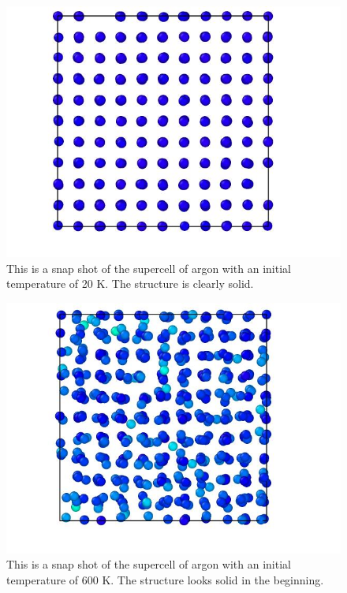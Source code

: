 \begin{multicols}{2}

\begin{figure}[H]
\includegraphics[width=\linewidth]{../figures/solid_20}\caption{This is a snap shot of the supercell of argon with an initial temperature of 20 K. The structure is clearly solid.}\label{fig:solid_20K}
\end{figure}

\begin{figure}[H]
\includegraphics[width=\linewidth]{../figures/solid_600}\caption{This is a snap shot of the supercell of argon with an initial temperature of 600 K. The structure looks solid in the beginning.}\label{fig:solid_600K}
\end{figure}


\end{multicols}
